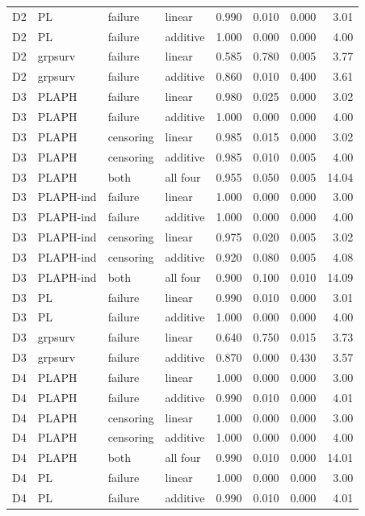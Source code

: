 \begin{longtable}{clllrrrr}
D2 & PL & failure & linear & 0.990 & 0.010 & 0.000 & 3.01 \\
D2 & PL & failure & additive & 1.000 & 0.000 & 0.000 & 4.00 \\
D2 & grpsurv & failure & linear & 0.585 & 0.780 & 0.005 & 3.77 \\
D2 & grpsurv & failure & additive & 0.860 & 0.010 & 0.400 & 3.61 \\
D3 & PLAPH & failure & linear & 0.980 & 0.025 & 0.000 & 3.02 \\
D3 & PLAPH & failure & additive & 1.000 & 0.000 & 0.000 & 4.00 \\
D3 & PLAPH & censoring & linear & 0.985 & 0.015 & 0.000 & 3.02 \\
D3 & PLAPH & censoring & additive & 0.985 & 0.010 & 0.005 & 4.00 \\
D3 & PLAPH & both & all four & 0.955 & 0.050 & 0.005 & 14.04 \\
D3 & PLAPH-ind & failure & linear & 1.000 & 0.000 & 0.000 & 3.00 \\
D3 & PLAPH-ind & failure & additive & 1.000 & 0.000 & 0.000 & 4.00 \\
D3 & PLAPH-ind & censoring & linear & 0.975 & 0.020 & 0.005 & 3.02 \\
D3 & PLAPH-ind & censoring & additive & 0.920 & 0.080 & 0.005 & 4.08 \\
D3 & PLAPH-ind & both & all four & 0.900 & 0.100 & 0.010 & 14.09 \\
D3 & PL & failure & linear & 0.990 & 0.010 & 0.000 & 3.01 \\
D3 & PL & failure & additive & 1.000 & 0.000 & 0.000 & 4.00 \\
D3 & grpsurv & failure & linear & 0.640 & 0.750 & 0.015 & 3.73 \\
D3 & grpsurv & failure & additive & 0.870 & 0.000 & 0.430 & 3.57 \\
D4 & PLAPH & failure & linear & 1.000 & 0.000 & 0.000 & 3.00 \\
D4 & PLAPH & failure & additive & 0.990 & 0.010 & 0.000 & 4.01 \\
D4 & PLAPH & censoring & linear & 1.000 & 0.000 & 0.000 & 3.00 \\
D4 & PLAPH & censoring & additive & 1.000 & 0.000 & 0.000 & 4.00 \\
D4 & PLAPH & both & all four & 0.990 & 0.010 & 0.000 & 14.01 \\
D4 & PL & failure & linear & 1.000 & 0.000 & 0.000 & 3.00 \\
D4 & PL & failure & additive & 0.990 & 0.010 & 0.000 & 4.01 \\

\end{longtable}
